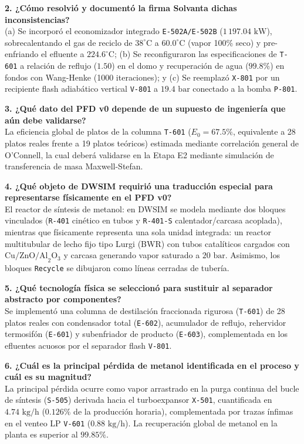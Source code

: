 \documentclass[11pt,letterpaper]{article}
\begin{document}
\textbf{2. ¿Cómo resolvió y documentó la firma Solvanta dichas inconsistencias?}\\
(a) Se incorporó el economizador integrado \texttt{E-502A/E-502B} ($1\,197.04\text{ kW}$), sobrecalentando el gas de reciclo de $38^\circ\text{C}$ a $60.0^\circ\text{C}$ (vapor 100\% seco) y pre-enfriando el efluente a $224.6^\circ\text{C}$; (b) Se reconfiguraron las especificaciones de \texttt{T-601} a relación de reflujo ($1.50$) en el domo y recuperación de agua ($99.8\%$) en fondos con Wang-Henke (1000 iteraciones); y (c) Se reemplazó \texttt{X-801} por un recipiente flash adiabático vertical \texttt{V-801} a $19.4\text{ bar}$ conectado a la bomba \texttt{P-801}.

\textbf{3. ¿Qué dato del PFD v0 depende de un supuesto de ingeniería que aún debe validarse?}\\
La eficiencia global de platos de la columna \texttt{T-601} ($E_0 = 67.5\%$, equivalente a 28 platos reales frente a 19 platos teóricos) estimada mediante correlación general de O'Connell, la cual deberá validarse en la Etapa E2 mediante simulación de transferencia de masa Maxwell-Stefan.

\textbf{4. ¿Qué objeto de DWSIM requirió una traducción especial para representarse físicamente en el PFD v0?}\\
El reactor de síntesis de metanol: en DWSIM se modela mediante dos bloques vinculados (\texttt{R-401} cinético en tubos y \texttt{R-401-S} calentador/carcasa acoplada), mientras que físicamente representa una sola unidad integrada: un reactor multitubular de lecho fijo tipo Lurgi (BWR) con tubos catalíticos cargados con $\text{Cu/ZnO/Al}_2\text{O}_3$ y carcasa generando vapor saturado a $20\text{ bar}$. Asimismo, los bloques \texttt{Recycle} se dibujaron como líneas cerradas de tubería.

\textbf{5. ¿Qué tecnología física se seleccionó para sustituir al separador abstracto por componentes?}\\
Se implementó una columna de destilación fraccionada rigurosa (\texttt{T-601}) de 28 platos reales con condensador total (\texttt{E-602}), acumulador de reflujo, rehervidor termosifón (\texttt{E-601}) y subenfriador de producto (\texttt{E-603}), complementada en los efluentes acuosos por el separador flash \texttt{V-801}.

\textbf{6. ¿Cuál es la principal pérdida de metanol identificada en el proceso y cuál es su magnitud?}\\
La principal pérdida ocurre como vapor arrastrado en la purga continua del bucle de síntesis (\texttt{S-505}) derivada hacia el turboexpansor \texttt{X-501}, cuantificada en $4.74\text{ kg/h}$ ($0.126\%$ de la producción horaria), complementada por trazas ínfimas en el venteo LP \texttt{V-601} ($0.88\text{ kg/h}$). La recuperación global de metanol en la planta es superior al $\mathbf{99.85\%}$.
\end{document}
